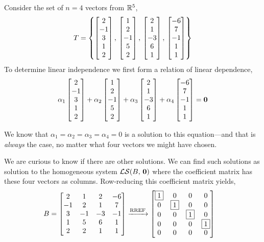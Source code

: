 \documentclass{ximera}
\begin{document}
\begin{example}%
Consider the set of $n=4$ vectors from $\mathbb{R}^{5}$,
\[
T=\left\{
\begin{bmatrix}2\\-1\\3\\1\\2\end{bmatrix},\,
\begin{bmatrix}1\\2\\-1\\5\\2\end{bmatrix},\,
\begin{bmatrix}2\\1\\-3\\6\\1\end{bmatrix},\,
\begin{bmatrix}-6\\7\\-1\\1\\1\end{bmatrix}
\right\}
\]
To determine linear independence we first form a relation of linear dependence,
\[
\alpha_1\begin{bmatrix}2\\-1\\3\\1\\2\end{bmatrix}+
\alpha_2\begin{bmatrix}1\\2\\-1\\5\\2\end{bmatrix}+
\alpha_3\begin{bmatrix}2\\1\\-3\\6\\1\end{bmatrix}+
\alpha_4\begin{bmatrix}-6\\7\\-1\\1\\1\end{bmatrix}
=\mathbf{0}
\]

We know that $\alpha_1=\alpha_2=\alpha_3=\alpha_4=0$ is a  solution to this equation---and that is \textit{always} the case, no matter what four vectors we might have chosen.

We are curious to know if there are other solutions.  We can find such
solutions as solution to the homogeneous system
$\mathcal{LS}\!\left(B,\,\mathbf{0}\right)$ where the coefficient matrix has these
four vectors as columns.  Row-reducing this coefficient matrix yields,
\begin{align*}
B=
\begin{bmatrix}
2&1&2&-6\\
-1&2&1&7\\
3&-1&-3&-1\\
1&5&6&1\\
2&2&1&1
\end{bmatrix}
&\xrightarrow{\text{RREF}}
\begin{bmatrix}
\fbox{1}&0&0&0\\
0&\fbox{1}&0&0\\
0&0&\fbox{1}&0\\
0&0&0&\fbox{1}\\
0&0&0&0
\end{bmatrix}
\end{align*}


\end{example}
\end{document}
